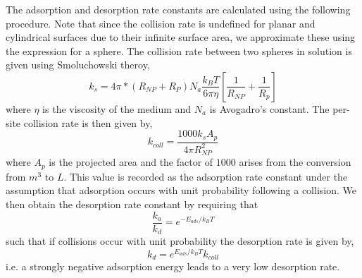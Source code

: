 \documentclass[10pt,a4paper,onecolumn]{report}
\begin{document}
The adsorption and desorption rate constants are calculated using the following procedure. Note that since the collision rate is undefined for planar and cylindrical surfaces due to their infinite surface area, we approximate these using the expression for a sphere. The collision rate between two spheres in solution is given using Smoluchowski theroy,
\begin{equation}
k_{s} = 4   \pi* \left(R_{NP} + R_{P} \right) N_a \frac{k_B T}{6 \pi \eta}\left[\frac{1}{R_{NP}} + \frac{1}{R_p} \right]
\end{equation}
 where $\eta$ is the viscosity of the medium and $N_a$ is Avogadro's constant. The per-site collision rate is then given by,
 \begin{equation}
 k_{coll} = \frac{1000 k_s A_p}{4 \pi R_{NP}^2}
 \end{equation}
 where $A_p$ is the projected area and the factor of $1000$ arises from the conversion from $m^{3}$ to $L$. This value is recorded as the adsorption rate constant under the assumption that adsorption occurs with unit probability following a collision. We then obtain the desorption rate constant by requiring that
 \begin{equation}
 \frac{k_a}{k_d} = e^{-E_{ads}/k_BT}
 \end{equation}
such that if collisions occur with unit probability the desorption rate is given by,
\begin{equation} \label{eq:kdbcp}
k_d = e^{E_{ads}/k_BT} k_{coll}
\end{equation}
 i.e. a strongly negative adsorption energy leads to a very low desorption rate. 
 
\end{document}
